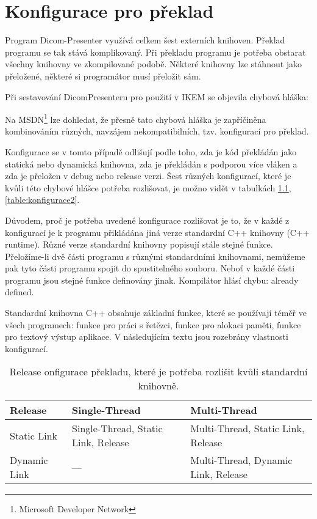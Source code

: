 \newpage
\chapter{Konfigurace pro překlad}
\label{sec:preklad}
Program Dicom-Presenter využívá celkem šest externích knihoven. Překlad programu se tak stává komplikovaný. Při překladu programu je potřeba obstarat všechny knihovny ve zkompilované podobě. Některé knihovny lze stáhnout jako přeložené, některé si programátor musí přeložit sám.

Při sestavování DicomPresenteru pro použití v IKEM se objevila chybová hláška:


Na MSDN\footnote{Microsoft Developer Network\cite{msdn}} lze dohledat, že přesně tato chybová hláška je zapříčiněna kombinováním různých, navzájem nekompatibilních, tzv. konfigurací pro překlad.

Konfigurace se v tomto případě odlišují podle toho, zda je kód překládán jako statická nebo dynamická knihovna, zda je překládán s podporou více vláken a zda je přeložen v debug nebo release verzi. Šest různých konfigurací, které je kvůli této chybové hlášce potřeba rozlišovat, je možno vidět v tabulkách \ref{table:konfigurace1}, \ref{table:konfigurace2}.

Důvodem, proč je potřeba uvedené konfigurace rozlišovat je to, že v každé z konfigurací je k programu přikládána jiná verze standardní C++ knihovny (C++ runtime). Různé verze standardní knihovny popisují stále stejné funkce. Přeložíme-li dvě části programu s různými standardními knihovnami, nemůžeme pak tyto části programu spojit do spustitelného souboru. Neboť v každé části programu jsou stejné funkce definovány jinak. Kompilátor hlásí chybu: already defined.

Standardní knihovna C++ obsahuje základní funkce, které se používají téměř ve všech programech: funkce pro práci s řetězci, funkce pro alokaci paměti, funkce pro textový výstup aplikace. V následujícím textu jsou rozebrány vlastnosti konfigurací.

\begin{table}[ht]
	\caption{Release onfigurace překladu, které je potřeba rozlišit kvůli standardní knihovně.}
  \label{table:konfigurace1}
	\centering
\begin{tabular}{| l|| p{5cm} | p{5.5cm}  |}
  \hline                       
  Release & Single-Thread & Multi-Thread \\
  \hline
  \hline                     
  Static Link & Single-Thread, Static Link, Release & Multi-Thread, Static Link, Release\\
  \hline
  Dynamic Link & --- & Multi-Thread, Dynamic Link, Release\\
  \hline  
\end{tabular}

\end{table}

